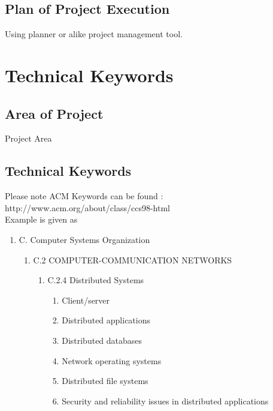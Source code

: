\documentclass[oneside,a4paper,12pt]{report}
\begin{document}
\section{Plan of Project Execution}
  Using planner or alike project management tool.



\chapter{Technical Keywords}
\section{Area of Project}
Project Area

\section{Technical Keywords}
Please note ACM Keywords can be found : http://www.acm.org/about/class/ccs98-html \\
Example is given as

\begin{enumerate}
	\item C. Computer Systems Organization
	\begin{enumerate}
		\item C.2 COMPUTER-COMMUNICATION NETWORKS
		\begin{enumerate}
			\item C.2.4 Distributed Systems
			\begin{enumerate}
				\item  Client/server
\item Distributed applications
\item Distributed databases
\item Network operating systems
\item Distributed file systems
\item Security and reliability issues in distributed applications
	 		\end{enumerate}
		\end{enumerate}



	\end{enumerate}
\end{enumerate}
\end{document}
